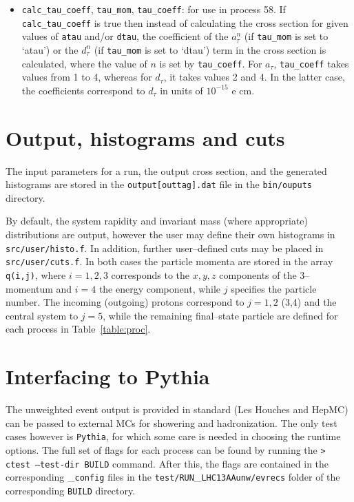 \documentclass[12pt]{article}
\begin{document}
\begin{itemize}
\item \texttt{calc\_tau\_coeff}, \texttt{tau\_mom}, \texttt{tau\_coeff}: for use in process 58. If  \texttt{calc\_tau\_coeff} is true then instead of calculating the cross section for given values of \texttt{atau} and/or \texttt{dtau}, the coefficient of the $a_\tau^n$ (if \texttt{tau\_mom} is set to `atau') or  the $d_\tau^n$ (if \texttt{tau\_mom} is set to `dtau') term in the cross section is calculated, where the value of $n$ is set by  \texttt{tau\_coeff}. For $a_\tau$,  \texttt{tau\_coeff} takes values from 1 to 4, whereas for $d_\tau$, it takes values 2 and 4. In the latter case, the coefficients correspond to $d_\tau$ in units of $10^{-15}$ e cm.

\end{itemize}

\section{Output, histograms and cuts}\label{sec:hist}

The input parameters for a run, the output cross section, and the generated histograms are stored in the \texttt{output[outtag].dat}
 file in the \texttt{bin/ouputs} directory. 

By default, the system rapidity and invariant mass (where appropriate) distributions are output, however the user may define their 
own histograms in \texttt{src/user/histo.f}. In addition, further user--defined cuts may be placed in \texttt{src/user/cuts.f}. In
 both cases the particle momenta are stored in the array \texttt{q(i,j)}, where $i=1,2,3$ corresponds to the $x,y,z$ components of 
 the 3--momentum and $i=4$ the energy component, while $j$ specifies the particle number. The incoming (outgoing) protons correspond 
 to $j=1,2$ (3,4) and the central system to $j=5$, while the remaining final--state particle are defined for each process in Table~\ref{table:proc}.

\section{Interfacing to Pythia}


The unweighted event output is provided in standard (Les Houches and HepMC) can be passed to external MCs for showering and 
hadronization. The only test cases however is \texttt{Pythia}, for which some care is needed in choosing the runtime options. The full set of flags for each process can be found by running the 
\newline
\newline
\texttt{>  ctest --test-dir BUILD}
\newline
\newline
command. After this, the flags are contained in the corresponding \_\texttt{config} files in the 
\newline
\newline
\texttt{test/RUN}\_\texttt{LHC13AAunw/evrecs}
\newline
\newline
folder of the corresponding \texttt{BUILD} directory.
\end{document}
